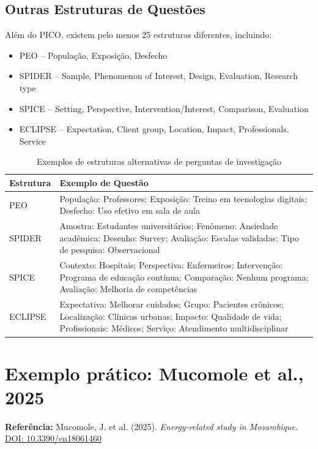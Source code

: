 \documentclass[12pt,a4paper]{article}
\begin{document}
\subsection{Outras Estruturas de Questões}
Além do PICO, existem pelo menos 25 estruturas diferentes, incluindo:

\begin{itemize}
    \item PEO – População, Exposição, Desfecho
    \item SPIDER – Sample, Phenomenon of Interest, Design, Evaluation, Research type
    \item SPICE – Setting, Perspective, Intervention/Interest, Comparison, Evaluation
    \item ECLIPSE – Expectation, Client group, Location, Impact, Professionals, Service
\end{itemize}

\begin{table}[h!]
\centering
\begin{tabular}{p{2.5cm} p{12cm}}
\toprule
Estrutura & Exemplo de Questão \\
\midrule
PEO & População: Professores; Exposição: Treino em tecnologias digitais; Desfecho: Uso efetivo em sala de aula \\
SPIDER & Amostra: Estudantes universitários; Fenômeno: Ansiedade acadêmica; Desenho: Survey; Avaliação: Escalas validadas; Tipo de pesquisa: Observacional \\
SPICE & Contexto: Hospitais; Perspectiva: Enfermeiros; Intervenção: Programa de educação contínua; Comparação: Nenhum programa; Avaliação: Melhoria de competências \\
ECLIPSE & Expectativa: Melhorar cuidados; Grupo: Pacientes crônicos; Localização: Clínicas urbanas; Impacto: Qualidade de vida; Profissionais: Médicos; Serviço: Atendimento multidisciplinar \\
\bottomrule
\end{tabular}
\caption{Exemplos de estruturas alternativas de perguntas de investigação}
\end{table}

\section{Exemplo prático: Mucomole et al., 2025}
\textbf{Referência:} Mucomole, J. et al. (2025). \textit{Energy-related study in Mozambique}. \href{https://doi.org/10.3390/en18061460}{DOI: 10.3390/en18061460}
\end{document}
